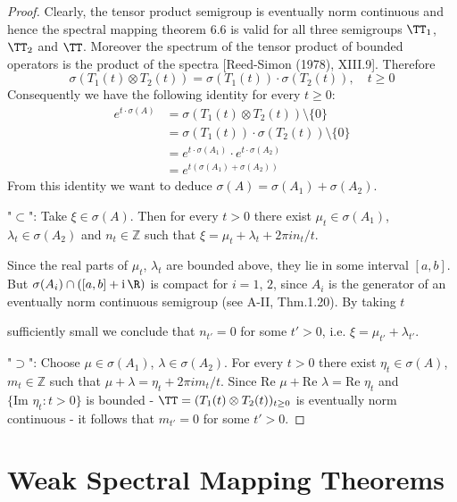 \begin{proof}
Clearly, the tensor product semigroup is eventually norm continuous and hence the spectral mapping theorem 6.6 is valid for all three semigroups $\TT_{1}$, $\TT_{2}$ and $\TT$.
Moreover the spectrum of the tensor product of bounded operators is the product of the spectra [Reed-Simon (1978), XIII.9].
Therefore
\[
\sigma(T_{1}(t)\otimes T_{2}(t)) = \sigma(T_{1}(t))\cdot\sigma(T_{2}(t)), \quad t \geq 0
\]
Consequently we have the following identity for every $t \geq 0$:
\begin{align*}
e^{t\cdot\sigma(A)} &= \sigma(T_{1}(t)\otimes T_{2}(t)) \setminus \{0\} \\
&= \sigma(T_{1}(t))\cdot\sigma(T_{2}(t)) \setminus \{0\} \\
&= e^{t\cdot\sigma(A_{1})}\cdot e^{t\cdot\sigma(A_{2})} \\
&= e^{t(\sigma(A_{1})+\sigma(A_{2}))}
\end{align*}
From this identity we want to deduce $\sigma(A) = \sigma(A_{1}) + \sigma(A_{2})$.

"$\subset$": Take $\xi \in \sigma(A)$.
Then for every $t > 0$ there exist $\mu_{t} \in \sigma(A_{1})$, $\lambda_{t} \in \sigma(A_{2})$ and $n_{t} \in \mathbb{Z}$ such that $\xi = \mu_{t} + \lambda_{t} + 2\pi i n_{t}/t$.

Since the real parts of $\mu_{t}$, $\lambda_{t}$ are bounded above, they lie in some interval $[a,b]$.
But $\sigma(A_{i}) \cap ([a,b] + \mathrm{i}\,\R)$ is compact for $i = 1$, $2$, since $A_{i}$ is the generator of an eventually norm continuous semigroup (see A-II, Thm.1.20).
By taking $t$

\newpage
sufficiently small we conclude that $n_{t'} = 0$ for some $t' > 0$, i.e. $\xi = \mu_{t'} + \lambda_{t'}$.

"$\supset$": Choose $\mu \in \sigma(A_{1})$, $\lambda \in \sigma(A_{2})$.
For every $t > 0$ there exist $\eta_{t} \in \sigma(A)$, $m_{t} \in \mathbb{Z}$ such that $\mu + \lambda = \eta_{t} + 2\pi i m_{t}/t$.
Since $\text{Re }\mu + \text{Re }\lambda = \text{Re }\eta_{t}$ and $\{\text{Im }\eta_{t}: t > 0\}$ is bounded - $\TT = (T_{1}(t) \otimes T_{2}(t))_{t\geq 0}$ is eventually norm continuous - it follows that $m_{t'} = 0$ for some $t' > 0$.
\end{proof}

\section{Weak Spectral Mapping Theorems}\label{sec:a3-7}

